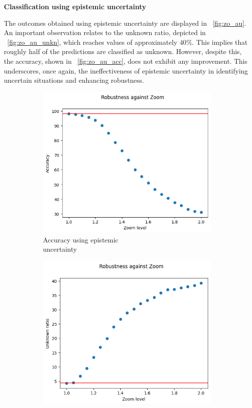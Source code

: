 \vspace{0.3cm}
\textbf{Classification using epistemic uncertainty}
\vspace{0.1cm}

The outcomes obtained using epistemic uncertainty are displayed in \Fig~\ref{fig:zo_au}. An important observation relates to the unknown ratio, depicted in \Fig~\ref{fig:zo_au_unkn}, which reaches values of approximately $40\%$. This implies that roughly half of the predictions are classified as unknown. However, despite this, the accuracy, shown in \Fig~\ref{fig:zo_au_acc}, does not exhibit any improvement. This underscores, once again, the ineffectiveness of epistemic uncertainty in identifying uncertain situations and enhancing robustness.

\begin{figure}[h]
	\centering
	\begin{subfigure}{.33\textwidth}
		\centering
		\includegraphics[width=0.9\linewidth]{ImageFiles/EvalBNN/ZO/EU/acc}
		\caption{Accuracy using epistemic \\ uncertainty}
		\label{fig:zo_eu_acc}
	\end{subfigure}%
	\begin{subfigure}{.33\textwidth}
		\centering
		\includegraphics[width=0.9\linewidth]{ImageFiles/EvalBNN/ZO/EU/unkn}

\end{subfigure}
\end{figure}
